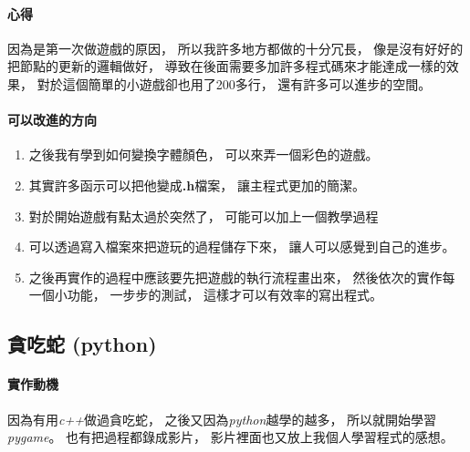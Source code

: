 \documentclass[12pt,oneside]{ctexart}
\begin{document}
\paragraph{心得}
\begin{adjustwidth}{2em}{0em}
   因為是第一次做遊戲的原因，
   所以我許多地方都做的十分冗長，
   像是沒有好好的把節點的更新的邏輯做好，
   導致在後面需要多加許多程式碼來才能達成一樣的效果，
   對於這個簡單的小遊戲卻也用了200多行，
   還有許多可以進步的空間。
\end{adjustwidth}

\paragraph{可以改進的方向}
\begin{adjustwidth}{2em}{0em}
\begin{enumerate}
    \item 
        之後我有學到如何變換字體顏色，
        可以來弄一個彩色的遊戲。
    \item 
        其實許多函示可以把他變成\textbf{.h}檔案，
        讓主程式更加的簡潔。
    \item
        對於開始遊戲有點太過於突然了，
        可能可以加上一個教學過程
    \item
        可以透過寫入檔案來把遊玩的過程儲存下來，
        讓人可以感覺到自己的進步。
    \item
        之後再實作的過程中應該要先把遊戲的執行流程畫出來，
        然後依次的實作每一個小功能，
        一步步的測試，
        這樣才可以有效率的寫出程式。
\end{enumerate}
    
\end{adjustwidth}

\clearpage

\subsection{ 貪吃蛇 (python) }

\paragraph{實作動機}
\begin{adjustwidth}{2em}{0em}
    因為有用\textit{c++}做過貪吃蛇，
    之後又因為\textit{python}越學的越多，
    所以就開始學習\textit{pygame}。
    也有把過程都錄成影片，
    影片裡面也又放上我個人學習程式的感想。
\end{adjustwidth}
\end{document}
